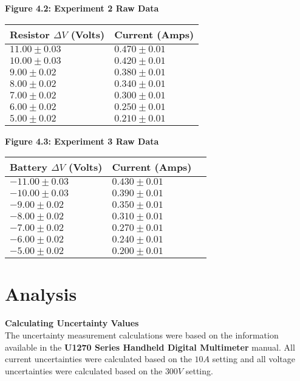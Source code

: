 \documentclass[
	letterpaper, %
	12pt, %
]{CSUniSchoolLabReport}
\begin{document}
\begin{center}
	\textbf{Figure 4.2: Experiment 2 Raw Data}
\end{center}
\begin{center}
	\begin{tabular}{  | l | l | }
		\hline
		Resistor $\Delta V$ (Volts) & Current (Amps) \\
		\hline
		$11.00\pm0.03$& $0.470\pm0.01$\\
		$10.00\pm0.03$& $0.420\pm0.01$\\
		$9.00\pm0.02$& $0.380\pm0.01$\\
		$8.00\pm0.02$& $0.340\pm0.01$\\
		$7.00\pm0.02$& $0.300\pm0.01$\\
		$6.00\pm0.02$& $0.250\pm0.01$\\
		$5.00\pm0.02$& $0.210\pm0.01$\\
		\hline
	\end{tabular}
\end{center}


\begin{center}
	\textbf{Figure 4.3: Experiment 3 Raw Data}
\end{center}
\begin{center}
	\begin{tabular}{ | l | l | l | }
		\hline
		Battery $\Delta V$ (Volts) & Current (Amps) \\
		\hline
		$-11.00\pm0.03$& $0.430\pm0.01$\\
		$-10.00\pm0.03$& $0.390\pm0.01$\\
		$-9.00\pm0.02$& $0.350\pm0.01$\\
		$-8.00\pm0.02$& $0.310\pm0.01$\\
		$-7.00\pm0.02$& $0.270\pm0.01$\\
		$-6.00\pm0.02$& $0.240\pm0.01$\\
		$-5.00\pm0.02$& $0.200\pm0.01$\\
		\hline
	\end{tabular}
\end{center}

\section{Analysis}
{\large\textbf{Calculating Uncertainty Values}}\\
The uncertainty measurement calculations were based on the information available in the \textbf{U1270 Series Handheld Digital Multimeter} manual. All current uncertainties were calculated based on the $10A$ setting and all voltage uncertainties were calculated based on the $300V$ setting.\\
\end{document}
